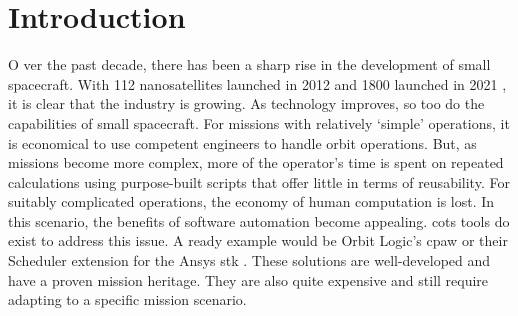 \glsresetall{} 
\chapter{Introduction}\label{chap:intro}



\lettrine[lines=2, findent=0pt, nindent=5pt]{O}{} ver the past decade, there
has been a sharp rise in the development of small spacecraft. With 112
nanosatellites launched in 2012 and 1800 launched in 2021
\cite{nanosats_total_2023}, it is clear that the industry is growing. As
technology improves, so too do the capabilities of small spacecraft. For
missions with relatively ‘simple’ operations, it is economical to use competent
engineers to handle orbit operations. But, as missions become more complex,
more of the operator’s time is spent on repeated calculations using
purpose-built scripts that offer little in terms of reusability. For suitably
complicated operations, the economy of human computation is lost. In this
scenario, the benefits of software automation become appealing.
\gls{cots} tools do exist to address this issue. A ready example
would be Orbit Logic’s \gls{cpaw} \cite{orbit_logic_cpaw_2021} or their
Scheduler extension for the Ansys \gls{stk} \cite{ansys_stk_nodate}. These
solutions are well-developed and have a proven mission heritage. They are also
quite expensive and still require adapting to a specific mission scenario.   



